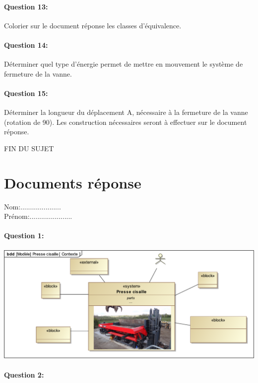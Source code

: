 \paragraph{Question 13:} Colorier sur le document réponse les classes d'équivalence.

\paragraph{Question 14:} Déterminer quel type d'énergie permet de mettre en mouvement le système de fermeture de la vanne.

\paragraph{Question 15:} Déterminer la longueur du déplacement A, nécessaire à la fermeture de la vanne (rotation de 90\textdegree). Les construction nécessaires seront à effectuer sur le document réponse.

\begin{center}
FIN DU SUJET
\end{center}

\newpage
\cleardoublepage

\section{Documents réponse}

Nom:.....................\\
Prénom:......................

\paragraph{Question 1:}

\begin{center}
 \includegraphics[width=0.8\linewidth]{img/contexte_vierge}
\end{center}

\paragraph{Question 2:}

